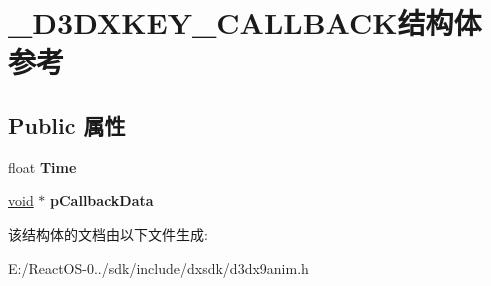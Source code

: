 \hypertarget{struct___d3_d_x_k_e_y___c_a_l_l_b_a_c_k}{}\section{\+\_\+\+D3\+D\+X\+K\+E\+Y\+\_\+\+C\+A\+L\+L\+B\+A\+C\+K结构体 参考}
\label{struct___d3_d_x_k_e_y___c_a_l_l_b_a_c_k}
\subsection*{Public 属性}
\begin{DoxyCompactItemize}
\item 
\mbox{\label{struct___d3_d_x_k_e_y___c_a_l_l_b_a_c_k_a7ac9ef8097270ad3d240f37eea59026b}} 
float {\bfseries Time}
\item 
\mbox{\label{struct___d3_d_x_k_e_y___c_a_l_l_b_a_c_k_af02018c6a996464cd6f645be6340f266}} 
\hyperlink{interfacevoid}{void} $\ast$ {\bfseries p\+Callback\+Data}
\end{DoxyCompactItemize}


该结构体的文档由以下文件生成\+:\begin{DoxyCompactItemize}
\item 
E\+:/\+React\+O\+S-\/0../sdk/include/dxsdk/d3dx9anim.\+h\end{DoxyCompactItemize}
